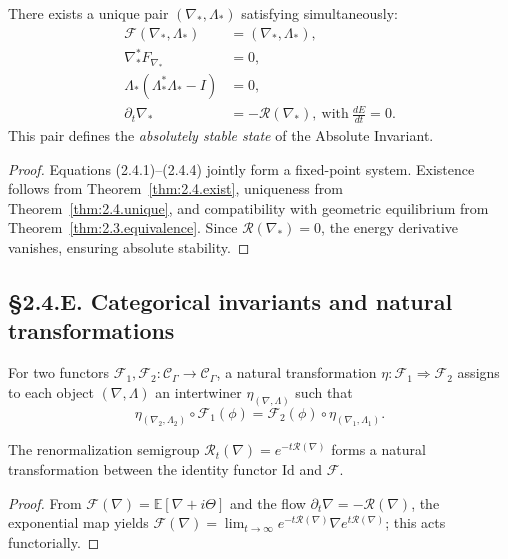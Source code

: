 \begin{theorem}\label{thm:2.4.main}
There exists a unique pair $(\nabla_\ast,\Lambda_\ast)$ satisfying simultaneously:
\begin{align}
\mathcal{F}(\nabla_\ast,\Lambda_\ast)&=(\nabla_\ast,\Lambda_\ast), \tag{2.4.1}\\
\nabla_\ast^\ast F_{\nabla_\ast}&=0,\tag{2.4.2}\\
\Lambda_\ast(\Lambda_\ast^\ast\Lambda_\ast-I)&=0,\tag{2.4.3}\\
\partial_t\nabla_\ast &= -\mathcal{R}(\nabla_\ast),\ \text{with}\ \frac{dE}{dt}=0.\tag{2.4.4}
\end{align}
This pair defines the \emph{absolutely stable state} of the Absolute Invariant.
\end{theorem}

\begin{proof}
Equations (2.4.1)–(2.4.4) jointly form a fixed-point system.
Existence follows from Theorem~\ref{thm:2.4.exist}, uniqueness from Theorem~\ref{thm:2.4.unique}, and compatibility with geometric equilibrium from Theorem~\ref{thm:2.3.equivalence}.  
Since $\mathcal{R}(\nabla_\ast)=0$, the energy derivative vanishes, ensuring absolute stability.
\end{proof}

\subsection*{§2.4.E. Categorical invariants and natural transformations}

\begin{definition}
For two functors $\mathcal{F}_1,\mathcal{F}_2:\mathcal{C}_\Gamma\to\mathcal{C}_\Gamma$,  
a natural transformation $\eta:\mathcal{F}_1\Rightarrow\mathcal{F}_2$ assigns to each object $(\nabla,\Lambda)$ an intertwiner $\eta_{(\nabla,\Lambda)}$ such that
\[
\eta_{(\nabla_2,\Lambda_2)}\circ \mathcal{F}_1(\phi)
= \mathcal{F}_2(\phi)\circ\eta_{(\nabla_1,\Lambda_1)}.
\]
\end{definition}

\begin{lemma}\label{lem:2.4.natural}
The renormalization semigroup $\mathcal{R}_t(\nabla)=e^{-t\mathcal{R}(\nabla)}$ forms a natural transformation between the identity functor $\mathrm{Id}$ and $\mathcal{F}$.
\end{lemma}

\begin{proof}
From $\mathcal{F}(\nabla)=\mathbb{E}[\nabla+i\Theta]$ and the flow $\partial_t\nabla=-\mathcal{R}(\nabla)$, the exponential map yields $\mathcal{F}(\nabla)=\lim_{t\to\infty}e^{-t\mathcal{R}(\nabla)}\nabla e^{t\mathcal{R}(\nabla)}$; this acts functorially.
\end{proof}

